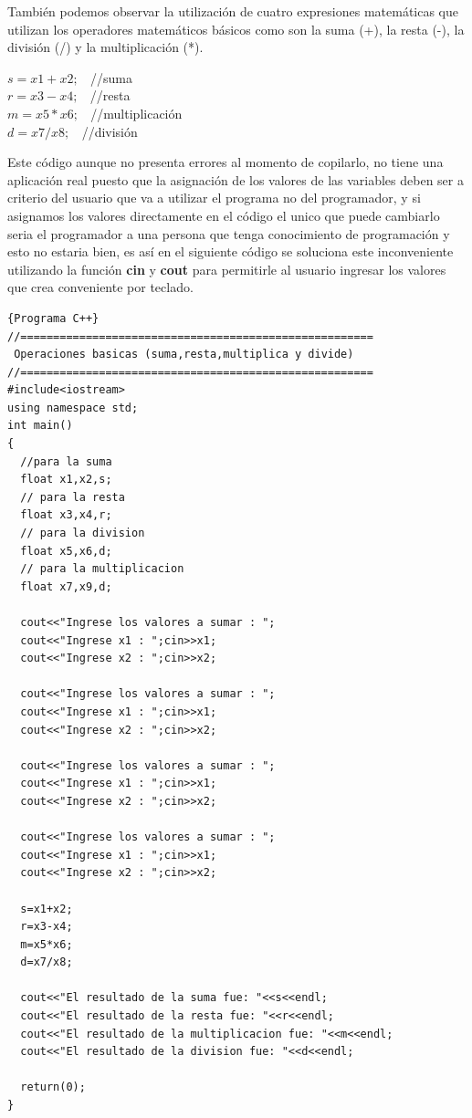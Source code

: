 \documentclass[a4paper,12pt,spanish]{article}
\begin{document}
    También podemos observar la utilización de cuatro expresiones matemáticas que utilizan los operadores matemáticos básicos como son la suma (+), la resta (-), la división (/) y la multiplicación (*).\\

    \begin{tcolorbox}[title=''Expresiones matemáticas'']
    $  s=x1+x2;  \;\; $               //suma\\
    $  r=x3-x4; \; \; $    //resta \\
    $  m=x5*x6; \;\; $     //multiplicación\\
    $  d=x7/x8; \;\; $    //división
    \end{tcolorbox}

    Este código aunque no presenta errores al momento de copilarlo, no tiene una aplicación real puesto que la asignación de los valores de las variables deben ser a criterio del usuario que va a utilizar el programa no del programador, y si asignamos los valores directamente en el código el unico que puede cambiarlo seria el programador a una persona que tenga conocimiento de programación y esto no estaria bien, es así en el siguiente código se soluciona este inconveniente utilizando la función \textbf{cin} y  \textbf{cout} para permitirle al usuario ingresar los valores que crea conveniente por teclado. 
\newpage
\begin{lstlisting}[frame=trBL,firstnumber=1,caption={\textbf{operbasi2.cpp}: Operaciones Básicas}]{Programa C++}
//======================================================
 Operaciones basicas (suma,resta,multiplica y divide)
//======================================================
#include<iostream>
using namespace std;
int main()
{
  //para la suma
  float x1,x2,s;
  // para la resta
  float x3,x4,r;
  // para la division
  float x5,x6,d;  
  // para la multiplicacion
  float x7,x9,d;
  
  cout<<"Ingrese los valores a sumar : ";
  cout<<"Ingrese x1 : ";cin>>x1;
  cout<<"Ingrese x2 : ";cin>>x2;

  cout<<"Ingrese los valores a sumar : ";
  cout<<"Ingrese x1 : ";cin>>x1;
  cout<<"Ingrese x2 : ";cin>>x2;

  cout<<"Ingrese los valores a sumar : ";
  cout<<"Ingrese x1 : ";cin>>x1;
  cout<<"Ingrese x2 : ";cin>>x2;

  cout<<"Ingrese los valores a sumar : ";
  cout<<"Ingrese x1 : ";cin>>x1;
  cout<<"Ingrese x2 : ";cin>>x2;

  s=x1+x2;
  r=x3-x4;
  m=x5*x6;
  d=x7/x8;

  cout<<"El resultado de la suma fue: "<<s<<endl;
  cout<<"El resultado de la resta fue: "<<r<<endl;
  cout<<"El resultado de la multiplicacion fue: "<<m<<endl;
  cout<<"El resultado de la division fue: "<<d<<endl;

  return(0);
}
  
\end{lstlisting}
\end{document}
